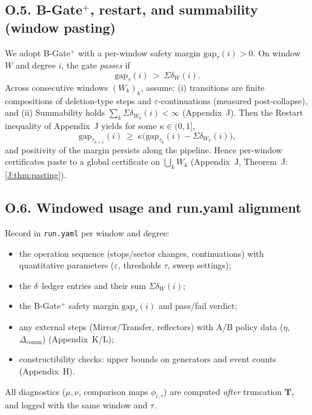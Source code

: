 \documentclass[11pt]{article}
\numberwithin{equation}{section}
\theoremstyle{definition}
\begin{document}
\subsection*{O.5. B-Gate$^{+}$, restart, and summability (window pasting)}
We adopt B-Gate\(^{+}\) with a per-window safety margin \(\mathrm{gap}_\tau(i)>0\).
On window \(W\) and degree \(i\), the gate \emph{passes} if
\[
\mathrm{gap}_\tau(i)\ >\ \Sigma\delta_W(i).
\]
Across consecutive windows \((W_k)_k\), assume:
(i) transitions are finite compositions of deletion-type steps and \(\varepsilon\)-continuations (measured post-collapse), and
(ii) Summability holds \(\sum_k \Sigma\delta_{W_k}(i)<\infty\) (Appendix~J).
Then the Restart inequality of Appendix~J yields for some \(\kappa\in(0,1]\),
\[
\mathrm{gap}_{\tau_{k+1}}(i)\ \ge\ \kappa\Big(\mathrm{gap}_{\tau_k}(i)-\Sigma\delta_{W_k}(i)\Big),
\]
and positivity of the margin persists along the pipeline.
Hence per-window certificates paste to a global certificate on \(\bigcup_k W_k\) (Appendix~J, Theorem~J:\ref{J:thm:pasting}).

\subsection*{O.6. Windowed usage and run.yaml alignment}
Record in \texttt{run.yaml} per window and degree:
\begin{itemize}\itemsep0.25em
  \item the operation sequence (stops/sector changes, continuations) with quantitative parameters (\(\varepsilon\), thresholds \(\tau\), sweep settings);
  \item the \(\delta\)–ledger entries and their sum \(\Sigma\delta_W(i)\);
  \item the B-Gate\(^{+}\) safety margin \(\mathrm{gap}_\tau(i)\) and pass/fail verdict;
  \item any external steps (Mirror/Transfer, reflectors) with A/B policy data (\(\eta\), \(\Delta_{\mathrm{comm}}\)) (Appendix~K/L);
  \item constructibility checks: upper bounds on generators and event counts (Appendix~H).
\end{itemize}
All diagnostics (\(\mu,\nu\), comparison maps \(\phi_{i,\tau}\)) are computed \emph{after} truncation \(\mathbf{T}_\tau\) and logged with the same window and \(\tau\).

\end{document}

